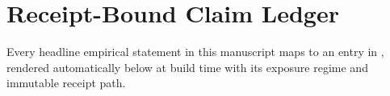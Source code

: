\section{Receipt-Bound Claim Ledger}
\label{app:claims}

Every headline empirical statement in this manuscript maps to an entry in , rendered automatically below at build time with its exposure regime and immutable receipt path.

\newcommand\claimentry[5]{%
  \noindent\textbf{\sffamily\small #1}\quad
  \texttt{\footnotesize [#2 | #3]}\par\nopagebreak
  \noindent #4\par\nopagebreak
  {\footnotesize\color{bhgrey}\emph{Evidence:} \code{#5}\par}\medskip}


